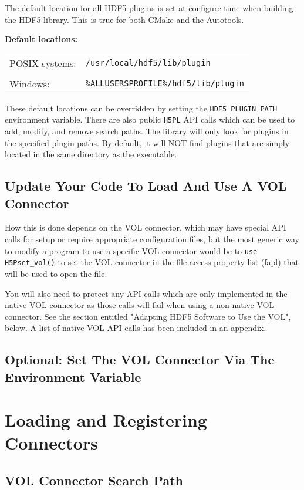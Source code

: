 The default location for all HDF5 plugins is set at configure time when building the HDF5 library. This is true for both CMake and the Autotools.

\textbf{Default locations:}

\begin{tabular}{ l l }
    POSIX systems: &  {\tt /usr/local/hdf5/lib/plugin} \\
     & \\
    Windows: & {\tt \%ALLUSERSPROFILE\%/hdf5/lib/plugin}
\end{tabular}

These default locations can be overridden by setting the {\tt HDF5\_PLUGIN\_PATH} environment variable. There are also public {\tt H5PL} API calls which can be used to add, modify, and remove search paths. The library will only look for plugins in the specified plugin paths. By default, it will NOT find plugins that are simply located in the same directory as the executable.

\subsection*{Update Your Code To Load And Use A VOL Connector}

How this is done depends on the VOL connector, which may have special API calls for setup or require appropriate configuration files, but the most generic way to modify a program to use a specific VOL connector would be to {\tt use H5Pset\_vol()} to set the VOL connector in the file access property list (fapl) that will be used to open the file.

You will also need to protect any API calls which are only implemented in the native VOL connector as those calls will fail when using a non-native VOL connector. See the section entitled "Adapting HDF5 Software to Use the VOL", below. A list of native VOL API calls has been included in an appendix.

\subsection*{Optional: Set The VOL Connector Via The Environment Variable}


\section{Loading and Registering Connectors}
\subsection{VOL Connector Search Path}
